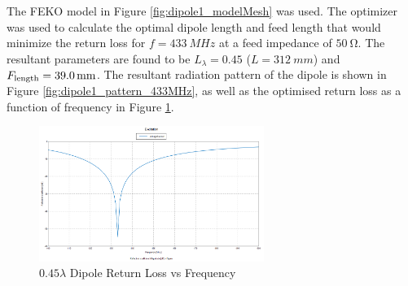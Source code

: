 The FEKO model in Figure \ref{fig:dipole1_modelMesh} was used. The optimizer was used to calculate the optimal dipole length and feed length that would minimize the return loss for $f = \SI{433}{MHz}$ at a feed impedance of $\SI{50}{\ohm}$. The resultant parameters are found to be $L_\lambda = 0.45$ ($L = \SI{312}{mm}$) and $F_{\textnormal{length}} = \SI{39.0}{mm}$. The resultant radiation pattern of the dipole is shown in Figure \ref{fig:dipole1_pattern_433MHz}, as well as the optimised return loss as a function of frequency in Figure \ref{fig:dipole1_returnLoss}.

\begin{figure}[!htb]
  \centering
  \includegraphics[width=0.65\textwidth]{dipole1_returnLoss}
  \caption{$0.45 \lambda$ Dipole Return Loss vs Frequency}
  \label{fig:dipole1_returnLoss}
\end{figure}